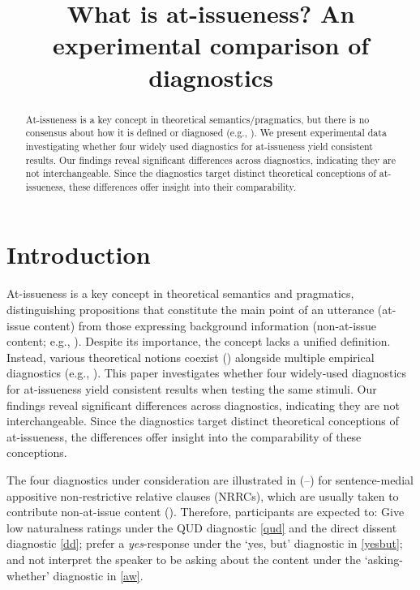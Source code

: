 \documentclass[times,linguex,xcolor]{glossa}
\title[What is at-issueness?]{What is at-issueness? An experimental comparison of diagnostics\\ 
  }
\author[]%
{%
}
\begin{document}
\maketitle


\begin{abstract}
  At-issueness is a key concept in theoretical semantics/pragmatics, but there is no consensus about how it is defined or diagnosed (e.g., \citealt{tonhauser_diagnosing_2012,tonhauser_how_2018,koev_notions_2018}). We present experimental data investigating whether four widely used diagnostics for at-issueness yield consistent results. Our findings reveal significant differences across diagnostics, indicating they are not interchangeable. Since the diagnostics target distinct theoretical conceptions of at-issueness, these differences offer insight into their comparability.

\end{abstract}


\section{Introduction \label{sec:1_introduction}}
  
  At-issueness is a key concept in theoretical semantics and pragmatics, distinguishing propositions that constitute the main point of an utterance (at-issue content) from those expressing background information (non-at-issue content; e.g., \citealt{karttunen_conventional_1979,horton_presuppositions_1988,abbott_presuppositions_2000,faller_semantics_2003,potts_logic_2005,tonhauser_diagnosing_2012}). Despite its importance, the concept lacks a unified definition. Instead, various theoretical notions coexist (\citealt{koev_notions_2018,tonhauser_how_2018}) alongside multiple empirical diagnostics (e.g., \citealt{tonhauser_diagnosing_2012}).
  This paper investigates whether four widely‐used diagnostics for at-issueness yield consistent results when testing the same stimuli. Our findings reveal significant differences across diagnostics, indicating they are not interchangeable. Since the diagnostics target distinct theoretical conceptions of at-issueness, the differences offer insight into the comparability of these conceptions.

  The four diagnostics under consideration are illustrated in (--) for sentence-medial appositive non-restrictive relative clauses (NRRCs), which are usually taken to contribute non-at-issue content (\citealt{potts_logic_2005}). Therefore, participants are expected to: Give low naturalness ratings under the QUD diagnostic \ref{qud} and the direct dissent diagnostic \ref{dd}; prefer a \emph{yes}-response under the `yes, but' diagnostic in \ref{yesbut}; and not interpret the speaker to be asking about the content under the `asking-whether' diagnostic in \ref{aw}.
\end{document}
